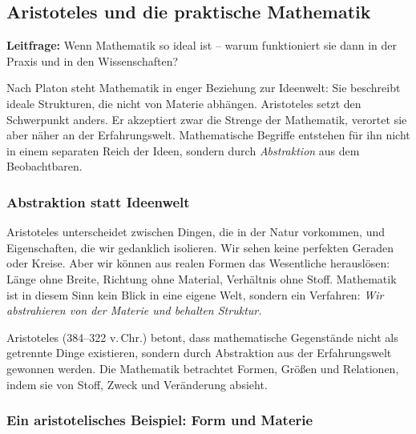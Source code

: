 \subsection{Aristoteles und die praktische Mathematik}
\label{sec:8.2}

\textbf{Leitfrage:} Wenn Mathematik so ideal ist -- warum funktioniert sie dann in der Praxis und in den Wissenschaften?

\medskip

Nach Platon steht Mathematik in enger Beziehung zur Ideenwelt:
Sie beschreibt ideale Strukturen,
die nicht von Materie abhängen.
Aristoteles setzt den Schwerpunkt anders.
Er akzeptiert zwar die Strenge der Mathematik,
verortet sie aber näher an der Erfahrungswelt.
Mathematische Begriffe entstehen für ihn nicht in einem separaten Reich der Ideen,
sondern durch \emph{Abstraktion} aus dem Beobachtbaren.

\subsubsection*{Abstraktion statt Ideenwelt}

Aristoteles unterscheidet zwischen Dingen,
die in der Natur vorkommen,
und Eigenschaften,
die wir gedanklich isolieren.
Wir sehen keine perfekten Geraden oder Kreise.
Aber wir können aus realen Formen das Wesentliche herauslösen:
Länge ohne Breite,
Richtung ohne Material,
Verhältnis ohne Stoff.
Mathematik ist in diesem Sinn kein Blick in eine eigene Welt,
sondern ein Verfahren:
\emph{Wir abstrahieren von der Materie und behalten Struktur.}

\begin{HistoryBox}
	\label{box:aristoteles-abstraktion}
	\small
	Aristoteles (384--322 v.\,Chr.) betont,
	dass mathematische Gegenstände nicht als getrennte Dinge existieren,
	sondern durch Abstraktion aus der Erfahrungswelt gewonnen werden.
	Die Mathematik betrachtet Formen,
	Größen und Relationen,
	indem sie von Stoff,
	Zweck und Veränderung absieht.
\end{HistoryBox}

\subsubsection*{Ein aristotelisches Beispiel: Form und Materie}

